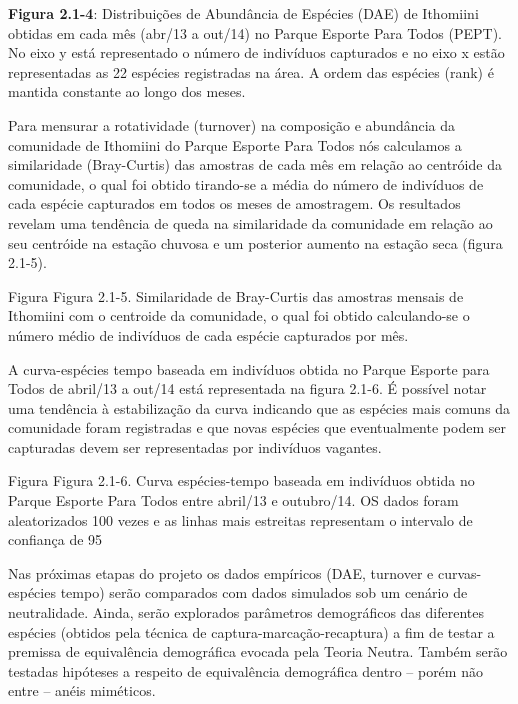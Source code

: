 \textbf{Figura 2.1-4}: Distribuições de Abundância de Espécies (DAE) de Ithomiini obtidas em cada mês (abr/13 a out/14) no Parque Esporte Para Todos (PEPT). No eixo y está representado o número de indivíduos capturados e no eixo x estão representadas as 22 espécies registradas na área. A ordem das espécies (rank) é mantida constante ao longo dos meses.

Para mensurar a rotatividade (turnover) na composição e abundância da comunidade de Ithomiini do Parque Esporte Para Todos nós calculamos a similaridade (Bray-Curtis) das amostras de cada mês em relação ao centróide da comunidade, o qual foi obtido tirando-se a média do número de indivíduos de cada espécie capturados em todos os meses de amostragem. Os resultados revelam uma tendência de queda na similaridade da comunidade em relação ao seu centróide na estação chuvosa e um posterior aumento na estação seca (figura 2.1-5).

Figura
Figura 2.1-5. Similaridade de Bray-Curtis das amostras mensais de Ithomiini com o centroide da comunidade, o qual foi obtido calculando-se o número médio de indivíduos de cada espécie capturados por mês.

A curva-espécies tempo baseada em indivíduos obtida no Parque Esporte para Todos de abril/13 a out/14 está representada na figura 2.1-6. É possível notar uma tendência à estabilização da curva indicando que as espécies mais comuns da comunidade foram registradas e que novas espécies que eventualmente podem ser capturadas devem ser representadas por indivíduos vagantes.

Figura
Figura 2.1-6. Curva espécies-tempo baseada em indivíduos obtida no Parque Esporte Para Todos entre abril/13 e outubro/14. OS dados foram aleatorizados 100 vezes e as linhas mais estreitas representam o intervalo de confiança de 95%

Nas próximas etapas do projeto os dados empíricos (DAE, turnover e curvas-espécies tempo) serão comparados com dados simulados sob um cenário de neutralidade. Ainda, serão explorados parâmetros demográficos das diferentes espécies (obtidos pela técnica de captura-marcação-recaptura) a fim de testar a premissa de equivalência demográfica evocada pela Teoria Neutra. Também serão testadas hipóteses a respeito de equivalência demográfica dentro – porém não entre – anéis miméticos.